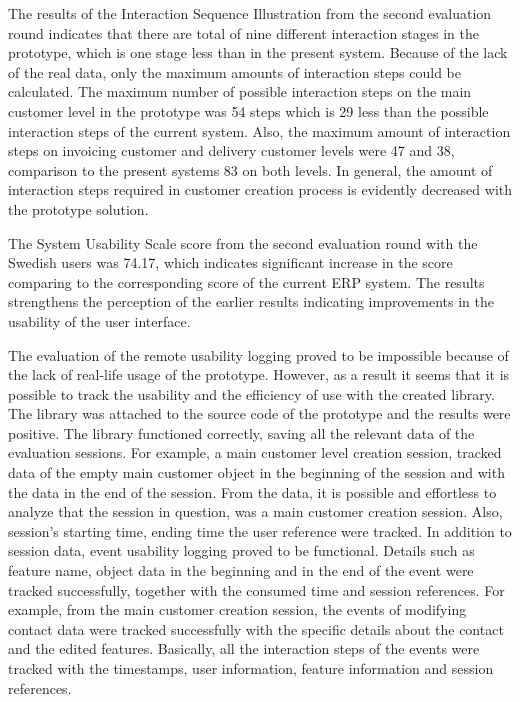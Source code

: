 \documentclass[12pt,a4paper,oneside,pdftex]{report}
\begin{document}
The results of the Interaction Sequence Illustration from the second evaluation round indicates that there are total of nine different interaction stages in the prototype, which is one stage less than in the present system. Because of the lack of the real data, only the maximum amounts of interaction steps could be calculated. The maximum number of possible interaction steps on the main customer level in the prototype was 54 steps which is  29 less than the possible interaction steps of the current system. Also, the maximum amount of interaction steps on invoicing customer and delivery customer levels were 47 and 38, comparison to the present systems 83 on both levels. In general, the amount of interaction steps required in customer creation process is evidently decreased with the prototype solution.

The System Usability Scale score from the second evaluation round with the Swedish users was 74.17, which indicates significant increase in the score comparing to the corresponding score of the current ERP system. The results strengthens the perception of the earlier results indicating improvements in the usability of the user interface. 
 
The evaluation of the remote usability logging proved to be impossible because of the lack of real-life usage of the prototype. However, as a result it seems that it is possible to track the usability and the efficiency of use with the created library. The library was attached to the source code of the prototype and the results were positive. The library functioned correctly, saving all the relevant data of the evaluation sessions. For example, a main customer level creation session, tracked data of the empty main customer object in the beginning of the session and with the data in the end of the session. From the data, it is possible and effortless to analyze that the session in question, was a main customer creation session. Also, session's starting time, ending time the user reference were tracked. In addition to session data, event usability logging proved to be functional. Details such as feature name, object data in the beginning and in the end of the event were tracked successfully, together with the consumed time and session references. For example, from the main customer creation session, the events of modifying contact data were tracked successfully with the specific details about the contact and the edited features. Basically, all the interaction steps of the events were tracked with the timestamps, user information, feature information and session references.
\end{document}
